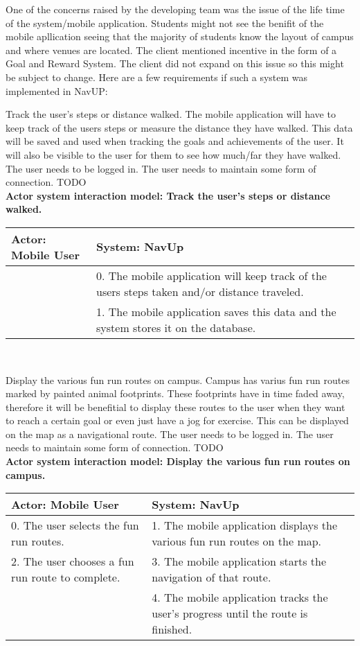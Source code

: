 One of the concerns raised by the developing team was the issue of the life time of the system/mobile application. Students might not see the benifit of the mobile apllication seeing that the majority of students know the layout of campus and where venues are located. The client mentioned incentive in the form of a Goal and Reward System. The client did not expand on this issue so this might be subject to change. Here are a few requirements if such a system was implemented in NavUP:

\FuncReq
{Track the user's steps or distance walked.}
{The mobile application will have to keep track of the users steps or measure the distance they have walked. This data will be saved and used when tracking the goals and achievements of the user. It will also be visible to the user for them to see how much/far they have walked.}
{The user needs to be logged in.
The user needs to maintain some form of connection.}
{TODO}
\\
\textbf{Actor system interaction model: Track the user's steps or distance walked.}\\
\begin{tabular}{ | p{6cm} | p{6cm} |}
\hline
Actor: Mobile User & System: NavUp \\ \hline
& 0. The mobile application will keep track of the users steps taken and/or distance traveled.\\ \hline
& 1. The mobile application saves this data and the system stores it on the database.\\ \hline
\end{tabular}
\\
\bigskip

\FuncReq
{Display the various fun run routes on campus.}
{Campus has varius fun run routes marked by painted animal footprints. These footprints have in time faded away, therefore it will be benefitial to display these routes to the user when they want to reach a certain goal or even just have a jog for exercise. This can be displayed on the map as a navigational route.}
{The user needs to be logged in.
The user needs to maintain some form of connection.}
{TODO}
\\
\textbf{Actor system interaction model: Display the various fun run routes on campus.}\\
\begin{tabular}{ | p{6cm} | p{6cm} |}
\hline
Actor: Mobile User & System: NavUp \\ \hline
0. The user selects the fun run routes. & 1. The mobile application displays the various fun run routes on the map.\\ \hline
2. The user chooses a fun run route to complete. & 3. The mobile application starts the navigation of that route.\\ \hline
& 4. The mobile application tracks the user's progress until the route is finished.\\ \hline
\end{tabular}
\\
\bigskip

